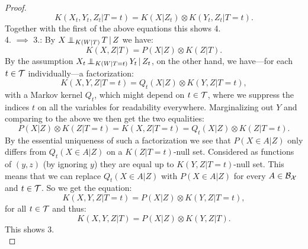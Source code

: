 \begin{Thm}
\begin{proof}
    \[K(X_t,Y_t,Z_t|T=t) = K(X|Z_t) \otimes K(Y_t,Z_t|T=t). \]
    Together with the first of the above equations this shows 4.\\
    4. $\implies$ 3.: By $X \operatorname*{\perp\mkern-11mu\perp}_{K(W|T)} T \operatorname*{|} Z$ we have:
    \[K(X,Z|T) = P(X|Z) \otimes K(Z|T).\]
    By the assumption $ X_t \operatorname*{\perp\mkern-11mu\perp}_{K(W|T=t)} Y_t \operatorname*{|} Z_t$, on the other hand, we have---for each $t \in \mathcal{T}$ individually---a factorization:
    \[ K(X,Y,Z|T=t) = Q_t(X|Z) \otimes K(Y,Z|T=t),  \]
    with a Markov kernel $Q_t$, which might depend on $t \in \mathcal{T}$, where we suppress the indices $t$ on all the variables for readability everywhere.
Marginalizing out $Y$ and comparing to the above we then get the two equalities:
\[ P(X|Z) \otimes K(Z|T=t) = K(X,Z|T=t)  = Q_t(X|Z) \otimes K(Z|T=t).\]
By the essential uniqueness of such a factorization we see that $P(X \in A|Z)$ only differs from $Q_t(X \in A|Z)$ on a $K(Z|T=t)$-null set. Considered as functions of $(y,z)$ (by ignoring $y$) they are equal up to $K(Y,Z|T=t)$-null set. This means that we can replace $Q_t(X \in A|Z)$ with $P(X\in A|Z)$ for every $A \in \mathcal{B}_{\mathcal{X}}$ and $t \in \mathcal{T}$. So we get the equation:
        \[ K(X,Y,Z|T=t) = P(X|Z) \otimes K(Y,Z|T=t),  \]
        for all $t \in \mathcal{T}$ and thus:
  \[ K(X,Y,Z|T) = P(X|Z) \otimes K(Y,Z|T).  \]
  This shows 3.\\ 

\end{proof}
\end{Thm}
